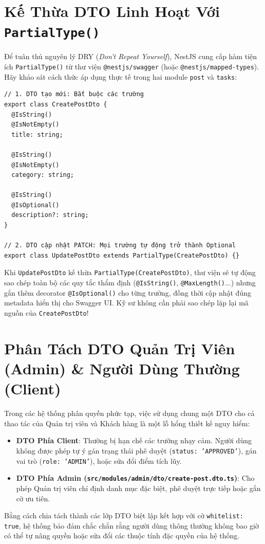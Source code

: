 \documentclass[12pt,a4paper,oneside]{book}
\begin{document}
\section{Kế Thừa DTO Linh Hoạt Với \texttt{PartialType()}}
Để tuân thủ nguyên lý DRY (\textit{Don't Repeat Yourself}), NestJS cung cấp hàm tiện ích \texttt{PartialType()} từ thư viện \texttt{@nestjs/swagger} (hoặc \texttt{@nestjs/mapped-types}). Hãy khảo sát cách thức áp dụng thực tế trong hai module \texttt{post} và \texttt{tasks}:

\begin{codebox}
\begin{Verbatim}[fontsize=\small]
// 1. DTO tạo mới: Bắt buộc các trường
export class CreatePostDto {
  @IsString()
  @IsNotEmpty()
  title: string;

  @IsString()
  @IsNotEmpty()
  category: string;

  @IsString()
  @IsOptional()
  description?: string;
}

// 2. DTO cập nhật PATCH: Mọi trường tự động trở thành Optional
export class UpdatePostDto extends PartialType(CreatePostDto) {}
\end{Verbatim}
\end{codebox}

\begin{infobox}
  Khi \texttt{UpdatePostDto} kế thừa \texttt{PartialType(CreatePostDto)}, thư viện sẽ tự động sao chép toàn bộ các quy tắc thẩm định (\texttt{@IsString()}, \texttt{@MaxLength()}...) nhưng gắn thêm decorator \texttt{@IsOptional()} cho từng trường, đồng thời cập nhật đúng metadata hiển thị cho Swagger UI. Kỹ sư không cần phải sao chép lặp lại mã nguồn của \texttt{CreatePostDto}!
\end{infobox}

\section{Phân Tách DTO Quản Trị Viên (Admin) \& Người Dùng Thường (Client)}
Trong các hệ thống phân quyền phức tạp, việc sử dụng chung một DTO cho cả thao tác của Quản trị viên và Khách hàng là một lỗ hổng thiết kế nguy hiểm:
\begin{itemize}
  \item \textbf{DTO Phía Client}: Thường bị hạn chế các trường nhạy cảm. Người dùng không được phép tự ý gán trạng thái phê duyệt (\texttt{status: 'APPROVED'}), gán vai trò (\texttt{role: 'ADMIN'}), hoặc sửa đổi điểm tích lũy.
  \item \textbf{DTO Phía Admin (\texttt{src/modules/admin/dto/create-post.dto.ts})}: Cho phép Quản trị viên chỉ định danh mục đặc biệt, phê duyệt trực tiếp hoặc gắn cờ ưu tiên.
\end{itemize}
Bằng cách chia tách thành các lớp DTO biệt lập kết hợp với cờ \texttt{whitelist: true}, hệ thống bảo đảm chắc chắn rằng người dùng thông thường không bao giờ có thể tự nâng quyền hoặc sửa đổi các thuộc tính đặc quyền của hệ thống.
\end{document}
